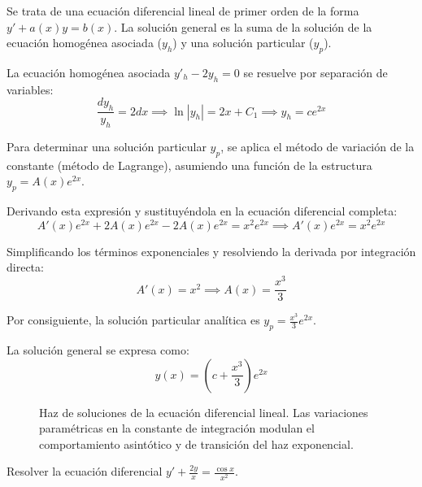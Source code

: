 \begin{tcolorbox}
Se trata de una ecuación diferencial lineal de primer orden de la forma $y' + a(x)y = b(x)$. La solución general es la suma de la solución de la ecuación homogénea asociada ($y_h$) y una solución particular ($y_p$).

La ecuación homogénea asociada $y'_h - 2y_h = 0$ se resuelve por separación de variables:
$$ \frac{dy_h}{y_h} = 2 dx \implies \ln|y_h| = 2x + C_1 \implies y_h = c e^{2x} $$

Para determinar una solución particular $y_p$, se aplica el método de variación de la constante (método de Lagrange), asumiendo una función de la estructura $y_p = A(x)e^{2x}$.

Derivando esta expresión y sustituyéndola en la ecuación diferencial completa:
$$ A'(x)e^{2x} + 2A(x)e^{2x} - 2A(x)e^{2x} = x^2 e^{2x} \implies A'(x)e^{2x} = x^2 e^{2x} $$

Simplificando los términos exponenciales y resolviendo la derivada por integración directa:
$$ A'(x) = x^2 \implies A(x) = \frac{x^3}{3} $$

Por consiguiente, la solución particular analítica es $y_p = \frac{x^3}{3}e^{2x}$. 

La solución general se expresa como:
$$ y(x) = \left(c + \frac{x^3}{3}\right)e^{2x} $$

\begin{figure}[H]
    \centering
    
    \caption{Haz de soluciones de la ecuación diferencial lineal. Las variaciones paramétricas en la constante de integración modulan el comportamiento asintótico y de transición del haz exponencial.}
\end{figure}
\end{tcolorbox}

\begin{ejercicio}
Resolver la ecuación diferencial $y' + \frac{2y}{x} = \frac{\cos x}{x^2}$.
\end{ejercicio}

